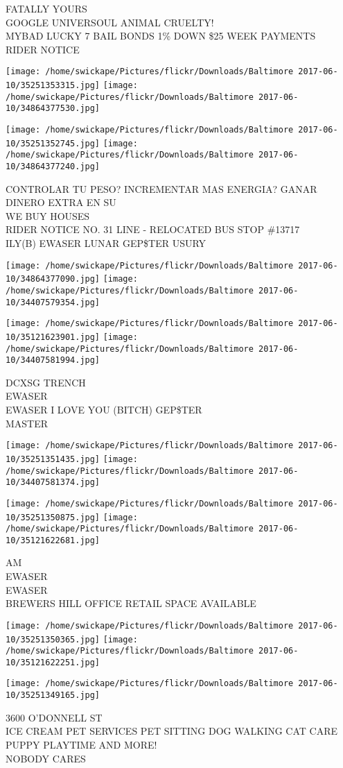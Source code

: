 \documentclass[10pt,letterpaper]{article}
\begin{document}
FATALLY YOURS\\
GOOGLE UNIVERSOUL ANIMAL CRUELTY!\\
MYBAD LUCKY 7 BAIL BONDS 1\% DOWN \$25 WEEK PAYMENTS\\
RIDER NOTICE
\pagebreak

\texttt{[image: /home/swickape/Pictures/flickr/Downloads/Baltimore 2017-06-10/35251353315.jpg]}
\texttt{[image: /home/swickape/Pictures/flickr/Downloads/Baltimore 2017-06-10/34864377530.jpg]}

\texttt{[image: /home/swickape/Pictures/flickr/Downloads/Baltimore 2017-06-10/35251352745.jpg]}
\texttt{[image: /home/swickape/Pictures/flickr/Downloads/Baltimore 2017-06-10/34864377240.jpg]}

CONTROLAR TU PESO? INCREMENTAR MAS ENERGIA? GANAR DINERO EXTRA EN SU\\
WE BUY HOUSES\\
RIDER NOTICE NO. 31 LINE {-} RELOCATED BUS STOP \#13717\\
ILY(B) EWASER LUNAR GEP\$TER USURY
\pagebreak

\texttt{[image: /home/swickape/Pictures/flickr/Downloads/Baltimore 2017-06-10/34864377090.jpg]}
\texttt{[image: /home/swickape/Pictures/flickr/Downloads/Baltimore 2017-06-10/34407579354.jpg]}

\texttt{[image: /home/swickape/Pictures/flickr/Downloads/Baltimore 2017-06-10/35121623901.jpg]}
\texttt{[image: /home/swickape/Pictures/flickr/Downloads/Baltimore 2017-06-10/34407581994.jpg]}

DCXSG TRENCH\\
EWASER\\
EWASER I LOVE YOU (BITCH) GEP\$TER\\
MASTER
\pagebreak

\texttt{[image: /home/swickape/Pictures/flickr/Downloads/Baltimore 2017-06-10/35251351435.jpg]}
\texttt{[image: /home/swickape/Pictures/flickr/Downloads/Baltimore 2017-06-10/34407581374.jpg]}

\texttt{[image: /home/swickape/Pictures/flickr/Downloads/Baltimore 2017-06-10/35251350875.jpg]}
\texttt{[image: /home/swickape/Pictures/flickr/Downloads/Baltimore 2017-06-10/35121622681.jpg]}

AM\\
EWASER\\
EWASER\\
BREWERS HILL OFFICE RETAIL SPACE AVAILABLE
\pagebreak

\texttt{[image: /home/swickape/Pictures/flickr/Downloads/Baltimore 2017-06-10/35251350365.jpg]}
\texttt{[image: /home/swickape/Pictures/flickr/Downloads/Baltimore 2017-06-10/35121622251.jpg]}

\texttt{[image: /home/swickape/Pictures/flickr/Downloads/Baltimore 2017-06-10/35251349165.jpg]}

3600 O'DONNELL ST\\
ICE CREAM PET SERVICES PET SITTING DOG WALKING CAT CARE PUPPY PLAYTIME AND MORE!\\
NOBODY CARES
\pagebreak
\end{document}
